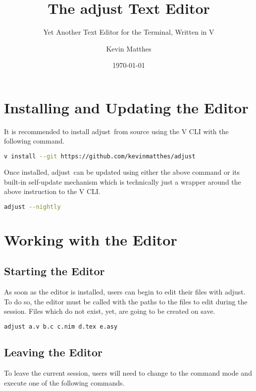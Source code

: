 \documentclass[11pt, a4paper, british]{scrartcl}
\author{Kevin Matthes}
\date{\today}
\subtitle{Yet Another Text Editor for the Terminal, Written in V}
\title{The adjust Text Editor}
\DeclareRobustCommand{\adjust}{\textsf{adjust}}
\begin{document}
\maketitle
\tableofcontents

\section{Installing and Updating the Editor}
\label{sec:installing-and-updating}
It is recommended to install \adjust\ from source using the V CLI with the
following command.

\begin{lstlisting}[caption = Installing \adjust\ from source, language = bash]
v install --git https://github.com/kevinmatthes/adjust
\end{lstlisting}

Once installed, \adjust\ can be updated using either the above command or
its built-in self-update mechanism which is technically just a wrapper around
the above instruction to the V CLI.

\begin{lstlisting}[caption = Updating \adjust, language = bash]
adjust --nightly
\end{lstlisting}

\section{Working with the Editor}
\label{sec:working}
\subsection{Starting the Editor}
\label{sec:working:starting}
As soon as the editor is installed, users can begin to edit their files with
\adjust.  To do so, the editor must be called with the paths to the files to
edit during the session.  Files which do not exist, yet, are going to be created
on save.

\begin{lstlisting}[caption = Starting \adjust, language = bash]
adjust a.v b.c c.nim d.tex e.asy
\end{lstlisting}

\subsection{Leaving the Editor}
\label{sec:working:leaving}
To leave the current session, users will need to change to the command mode and
execute one of the following commands.
\end{document}
